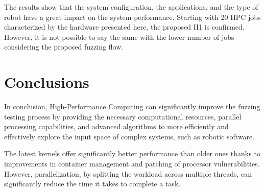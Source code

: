 \documentclass{svproc}
\begin{document}
The results show that the system configuration, the applications, and the type of robot have a great impact on the system performance. Starting with 20 HPC jobs characterized by the hardware presented here, the proposed H1 is confirmed. However, it is not possible to say the same with the lower number of jobs considering the proposed fuzzing flow. 

\section{Conclusions}
\label{sec:conclusions}

In conclusion, High-Performance Computing can significantly improve the fuzzing testing process by providing the necessary computational resources, parallel processing capabilities, and advanced algorithms to more efficiently and effectively explore the input space of complex systems, such as robotic software. 

The latest kernels offer significantly better performance than older ones thanks to improvements in container management and patching of processor vulnerabilities. However, parallelization, by splitting the workload across multiple threads, can significantly reduce the time it takes to complete a task.
  



\newpage
\end{document}
